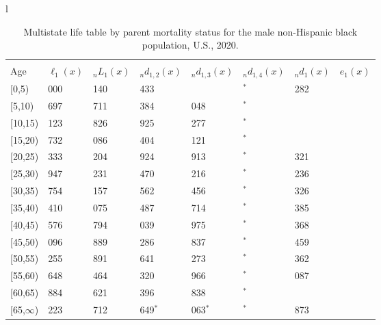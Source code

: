\documentclass[
]{article}
\begin{document}
\begin{table}
\caption{\label{tab:table-nhblack-male}Multistate life table by parent mortality status for the male non-Hispanic black population, U.S., 2020.}

\centering
\fontsize{9}{11}\selectfont
\begin{tabular}[t]{l}
\hline
\begin{tabular}{>{\raggedright\arraybackslash}p{.45in}>{\raggedleft\arraybackslash}p{.65in}>{\raggedleft\arraybackslash}p{.65in}>{\raggedleft\arraybackslash}p{.65in}>{\raggedleft\arraybackslash}p{.65in}>{\raggedleft\arraybackslash}p{.65in}>{\raggedleft\arraybackslash}p{.65in}>{\raggedleft\arraybackslash}p{.65in}}
\toprule
\multicolumn{1}{c}{ } & \multicolumn{7}{c}{(1) Lost neither} \\
\cmidrule(l{3pt}r{3pt}){2-8}
Age & $\ell_{1}(x)$ & ${}_nL_{1}(x)$ & ${}_nd_{1,2}(x)$ & ${}_nd_{1,3}(x)$ & ${}_nd_{1,4}(x)$ & ${}_nd_{1}(x)$ & $e_{1}(x)$\\
\midrule
{}[0,5) & 100 000 & 489 140 & 1 433 & 570 & 18$^{*}$ & 1 282 & 39\\
{}[5,10) & 96 697 & 477 711 & 1 384 & 1 048 & 37$^{*}$ & 105 & 35\\
{}[10,15) & 94 123 & 461 826 & 1 925 & 1 277 & 35$^{*}$ & 155 & 30\\
{}[15,20) & 90 732 & 442 086 & 2 404 & 1 121 & 76$^{*}$ & 798 & 25\\
{}[20,25) & 86 333 & 412 204 & 2 924 & 1 913 & 229$^{*}$ & 1 321 & 21\\
\addlinespace
{}[25,30) & 79 947 & 373 231 & 3 470 & 1 216 & 269$^{*}$ & 1 236 & 17\\
{}[30,35) & 73 754 & 334 157 & 4 562 & 1 456 & 0$^{*}$ & 1 326 & 13\\
{}[35,40) & 66 410 & 284 075 & 6 487 & 2 714 & 248$^{*}$ & 1 385 & 10\\
{}[40,45) & 55 576 & 225 794 & 6 039 & 1 975 & 98$^{*}$ & 1 368 & 7\\
{}[45,50) & 46 096 & 178 889 & 5 286 & 1 837 & 259$^{*}$ & 1 459 & 5\\
\addlinespace
{}[50,55) & 37 255 & 118 891 & 5 641 & 2 273 & 331$^{*}$ & 1 362 & 3\\
{}[55,60) & 27 648 & 63 464 & 4 320 & 1 966 & 391$^{*}$ & 1 087 & 2\\
{}[60,65) & 19 884 & 37 621 & 3 396 & 1 838 & 455$^{*}$ & 972 & 1\\
{}[65,$\infty$) & 13 223 & 26 712 & 1 649$^{*}$ & 3 063$^{*}$ & 0$^{*}$ & 1 873 & 0\\

\end{tabular}
\end{tabular}
\end{table}
\end{document}
